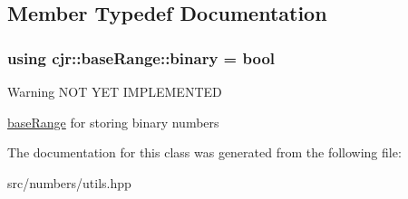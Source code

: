 \subsection{Member Typedef Documentation}
\hypertarget{classcjr_1_1base_range_a5f25722f51adfdcb6568431af1ac3cfb}{
\subsubsection[{binary}]{\setlength{\rightskip}{0pt plus 5cm}using {\bf cjr\-::base\-Range\-::binary} =  bool}}\label{classcjr_1_1base_range_a5f25722f51adfdcb6568431af1ac3cfb}
\begin{DoxyWarning}{Warning}
N\-O\-T Y\-E\-T I\-M\-P\-L\-E\-M\-E\-N\-T\-E\-D
\end{DoxyWarning}
\hyperlink{classcjr_1_1base_range}{base\-Range} for storing binary numbers 

The documentation for this class was generated from the following file\-:\begin{DoxyCompactItemize}
\item 
src/numbers/utils.\-hpp\end{DoxyCompactItemize}
